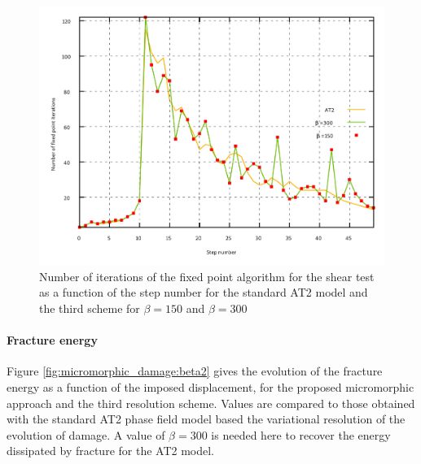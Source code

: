 \begin{figure}[H]
  \centering
  \includegraphics[width=10.cm]{../chapter_003_ef_micromorphic/figures/shear-iterations.pdf}
  \caption{Number of iterations of the fixed point algorithm for the shear test
  as a function of the step number for the standard AT2 model and the
  third scheme for \(\beta=150\) and
  \(\beta=300\)}
  \label{fig:micromorphic_damage:shear:iterations}
\end{figure}



\paragraph{Fracture energy}

Figure \ref{fig:micromorphic_damage:beta2} gives the evolution of the fracture energy as a function
of the imposed displacement, for the
proposed micromorphic approach and the third resolution scheme.
Values are compared to those obtained with the standard AT2 phase field model based the variational resolution of the evolution of damage.
A value of $\beta = 300$ is needed here to recover the energy dissipated by fracture for the AT2 model.

